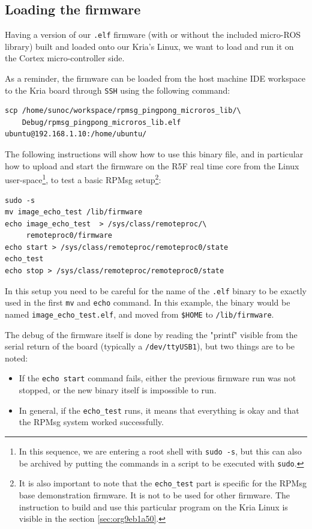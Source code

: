 \documentclass[10pt]{article}
\begin{document}
\clearpage
\subsection{Loading the firmware}
\label{sec:org1c802e3}
Having a version of our \texttt{.elf} firmware (with or without the included
micro-ROS library) built and loaded onto our Kria's Linux, we want to load and run it
on the Cortex micro-controller side.

As a reminder, the firmware can be loaded from the host machine IDE workspace
to the Kria board through \texttt{SSH} using the following command:
\begin{verbatim}
scp /home/sunoc/workspace/rpmsg_pingpong_microros_lib/\
    Debug/rpmsg_pingpong_microros_lib.elf  ubuntu@192.168.1.10:/home/ubuntu/
\end{verbatim}

The following instructions will show how to use this binary file, and
in particular how to upload and start the firmware on the R5F real time core
from the Linux user-space\footnote{In this sequence, we are entering a root shell with \texttt{sudo -s}, but this can
also be archived by putting the commands in a script to be executed with \texttt{sudo}.}, to test a basic RPMsg setup\footnote{It is also important to note that the \texttt{echo\_test} part is specific for the
RPMsg base demonstration firmware. It is not to be used for other firmware.
The instruction to build and use this particular program on the Kria Linux
is visible in the section \ref{sec:org9eb1a50}.}:
\begin{verbatim}
sudo -s
mv image_echo_test /lib/firmware
echo image_echo_test  > /sys/class/remoteproc/\
     remoteproc0/firmware
echo start > /sys/class/remoteproc/remoteproc0/state
echo_test
echo stop > /sys/class/remoteproc/remoteproc0/state
\end{verbatim}

In this setup you need to be careful for the name of the \texttt{.elf} binary to be exactly used
in the first \texttt{mv} and \texttt{echo} command. In this example, the binary would be named
\texttt{image\_echo\_test.elf}, and moved from \texttt{\$HOME} to \texttt{/lib/firmware}.

The debug of the firmware itself is done by reading the "printf" visible from the serial
return of the board (typically a \texttt{/dev/ttyUSB1}), but two things are to be noted:
\begin{itemize}
\item If the \texttt{echo start} command fails, either the previous firmware run was not stopped,
or the new binary itself is impossible to run.
\item In general, if the \texttt{echo\_test} runs, it means that everything is okay and that
the RPMsg system worked successfully.
\end{itemize}
\end{document}
